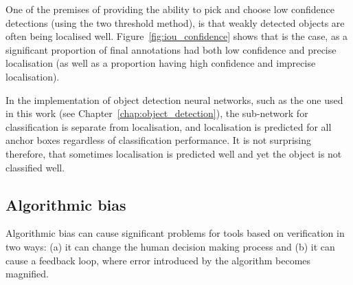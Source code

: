 One of the premises of providing the ability to pick and choose low confidence detections (using the two threshold method), is that weakly detected objects are often being localised well. Figure~\ref{fig:iou_confidence} shows that is the case, as a significant proportion of final annotations had both low confidence and  precise localisation (as well as a proportion having high confidence and imprecise localisation).


\begin{table}[h]
\caption{Breakdown by dataset of detections included as an annotation; confident if $ p > 0.7 $, precise if $ IoU > 0.85 $ with respect to final annotation} 
    \centering
\noindent{}
\label{tab:confidence_precision}
\end{table}

In the implementation of object detection neural networks, such as the one used in this work (see Chapter~\ref{chap:object_detection}), the sub-network for classification is separate from localisation, and localisation is predicted for all anchor boxes regardless of classification performance. It is not surprising therefore, that sometimes localisation is predicted well and yet the object is not classified well.


\subsection{Algorithmic bias}
\label{sec:machine_bias}

Algorithmic bias can cause significant problems for tools based on verification in two ways: (a) it can change the human decision making process and (b) it can cause a feedback loop, where error introduced by the algorithm becomes magnified.

